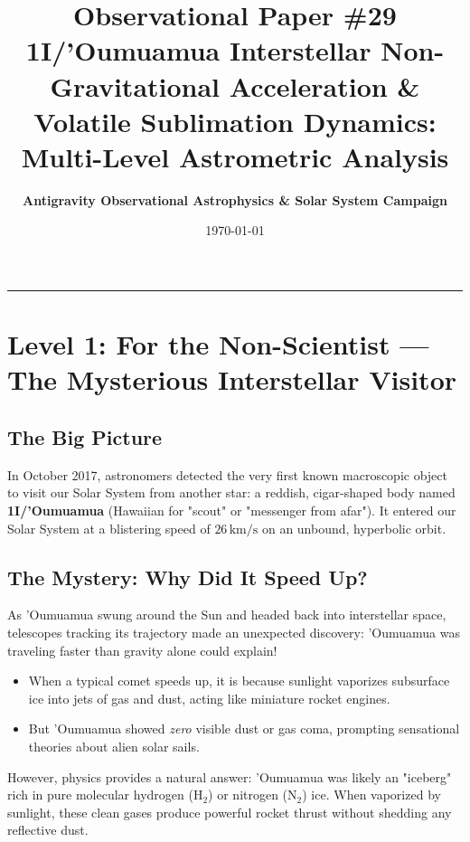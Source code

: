 \documentclass[11pt,a4paper]{article}
\title{\Huge \textbf{Observational Paper \#29}\\ \Large 1I/'Oumuamua Interstellar Non-Gravitational Acceleration \& Volatile Sublimation Dynamics: Multi-Level Astrometric Analysis}
\author{\textbf{Antigravity Observational Astrophysics \& Solar System Campaign}}
\date{\today}
\begin{document}
\maketitle

\vspace{-1em}
\begin{center}
\rule{\textwidth}{1.5pt}
\end{center}

\section*{Level 1: For the Non-Scientist — The Mysterious Interstellar Visitor}

\subsection*{The Big Picture}
In October 2017, astronomers detected the very first known macroscopic object to visit our Solar System from another star: a reddish, cigar-shaped body named \textbf{1I/'Oumuamua} (Hawaiian for "scout" or "messenger from afar"). It entered our Solar System at a blistering speed of $26\,\text{km/s}$ on an unbound, hyperbolic orbit.

\subsection*{The Mystery: Why Did It Speed Up?}
As 'Oumuamua swung around the Sun and headed back into interstellar space, telescopes tracking its trajectory made an unexpected discovery: 'Oumuamua was traveling faster than gravity alone could explain! 
\begin{itemize}
    \item When a typical comet speeds up, it is because sunlight vaporizes subsurface ice into jets of gas and dust, acting like miniature rocket engines.
    \item But 'Oumuamua showed \textit{zero} visible dust or gas coma, prompting sensational theories about alien solar sails.
\end{itemize}
However, physics provides a natural answer: 'Oumuamua was likely an "iceberg" rich in pure molecular hydrogen ($\mathrm{H_2}$) or nitrogen ($\mathrm{N_2}$) ice. When vaporized by sunlight, these clean gases produce powerful rocket thrust without shedding any reflective dust.
\end{document}
